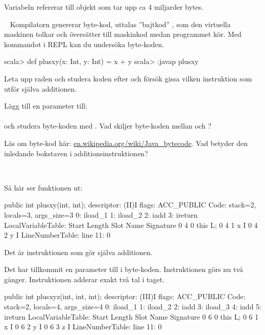\SubtaskSolved Variabeln  refererar till objekt som tar upp ca 4 miljarder bytes.

\QUESTEND





\QUESTBEGIN

\Task\Uberkurs  \what~  Kompilatorn genererar byte-kod, uttalas ''bajtkod'' , som den virtuella maskinen tolkar och översätter till maskinkod medan programmet kör. Med kommandot  i REPL kan du undersöka byte-koden.
\begin{REPL}
scala> def plusxy(x: Int, y: Int) = x + y
scala> :javap plusxy
\end{REPL}

\Subtask Leta upp raden  och studera koden efter  och försök gissa vilken instruktion som utför själva additionen.

\Subtask Lägg till en parameter till: \\ 
\\ och studera byte-koden med . Vad skiljer byte-koden mellan  och ?

\Subtask Läs om byte-kod här: \href{https://en.wikipedia.org/wiki/Java\_bytecode}{en.wikipedia.org/wiki/Java\_bytecode}. Vad betyder den inledande bokstaven i additionsinstruktionen?


\SOLUTION

\TaskSolved \what~

\SubtaskSolved Så här ser funktionen  ut:
\begin{REPL}
public int plusxy(int, int);
  descriptor: (II)I
  flags: ACC_PUBLIC
  Code:
    stack=2, locals=3, args_size=3
       0: iload_1
       1: iload_2
       2: iadd
       3: ireturn
    LocalVariableTable:
      Start  Length  Slot  Name   Signature
          0       4     0  this   L;
          0       4     1     x   I
          0       4     2     y   I
    LineNumberTable:
      line 11: 0
\end{REPL}
Det är instruktionen  som gör själva additionen.


\SubtaskSolved Det har tillkommit en parameter till i byte-koden. Instruktionen  görs nu två gånger. Instruktionen  adderar exakt två tal i taget.

\begin{REPL}
public int plusxyz(int, int, int);
  descriptor: (III)I
  flags: ACC_PUBLIC
  Code:
    stack=2, locals=4, args_size=4
       0: iload_1
       1: iload_2
       2: iadd
       3: iload_3
       4: iadd
       5: ireturn
    LocalVariableTable:
      Start  Length  Slot  Name   Signature
          0       6     0  this   L;
          0       6     1     x   I
          0       6     2     y   I
          0       6     3     z   I
    LineNumberTable:
      line 11: 0
\end{REPL}


